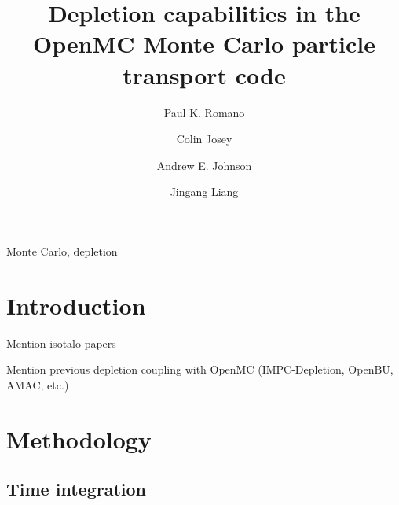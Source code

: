 \documentclass[3p,authoryear]{elsarticle}
\begin{document}
\title{Depletion capabilities in the OpenMC Monte Carlo particle transport code}

\author[anl]{Paul K. Romano}

\author[lanl]{Colin Josey}

\author[gatech]{Andrew E. Johnson}

\author[tsinghua]{Jingang Liang}

\address[anl]{Argonne National Laboratory, 9700 S. Cass Ave, Lemont, IL 60439, United States}
\address[lanl]{Los Alamos National Laboratory, PO Box 1663, Los Alamos, NM 87545, United States}
\address[gatech]{Georgia Institute of Technology, 770 State St NW, Atlanta, GA 30318, United States}
\address[tsinghua]{Institute of Nuclear and New Energy Technology, Tsinghua University, Beijing, China}

\begin{abstract}

\end{abstract}

\begin{keyword}
  Monte Carlo, depletion
\end{keyword}

\maketitle

\section{Introduction}

Mention isotalo papers

Mention previous depletion coupling with OpenMC (IMPC-Depletion, OpenBU, AMAC,
etc.)

\section{Methodology}
\label{sec:methods}

\subsection{Time integration}
\end{document}
